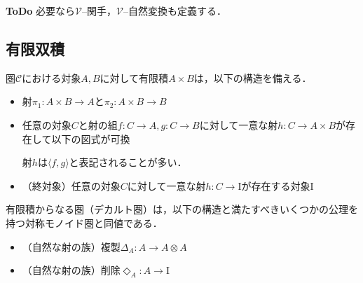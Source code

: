 \documentclass[type_judgement.tex]{subfiles}
\begin{document}
{\bf ToDo} 必要なら$\mathcal{V}$--関手，$\mathcal{V}$--自然変換も定義する．

\subsection{有限双積}
\begin{defn}
圏$\mathcal{C}$における対象$A,B$に対して有限積$A \times B$は，以下の構造を備える．
\begin{itemize}
    \item 射$\pi_1:A \times B \rightarrow A$と$\pi_2:A \times B \rightarrow B$
    \item 任意の対象$C$と射の組$f:C \rightarrow A, g:C \rightarrow B$に対して一意な射$h:C \rightarrow A \times B$が存在して以下の図式が可換
    \begin{center}
    \end{center}
    射$h$は$\langle f,g \rangle$と表記されることが多い．
    \item （終対象）任意の対象$C$に対して一意な射$h:C \rightarrow \mathrm{I}$が存在する対象$\mathrm{I}$
\end{itemize}

\end{defn}
有限積からなる圏（デカルト圏）は，以下の構造と満たすべきいくつかの公理\cite{selinger09}を持つ対称モノイド圏と同値である．
\begin{itemize}
    \item （自然な射の族）複製$\Delta_A:A \rightarrow A \otimes A$
    \item （自然な射の族）削除$\Diamond_A:A \rightarrow \mathrm{I}$
\end{itemize}
\end{document}
